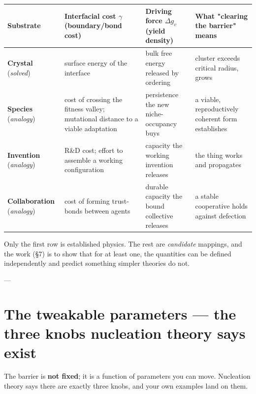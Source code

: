 \documentclass{article}
\begin{document}
\begin{center}
\begin{tabular}{>{\raggedright\arraybackslash}p{3.5cm}>{\raggedright\arraybackslash}p{3.5cm}>{\raggedright\arraybackslash}p{3.5cm}>{\raggedright\arraybackslash}p{3.5cm}}
\toprule
\textbf{Substrate} & \textbf{Interfacial cost $\gamma$ (boundary/bond cost)} & \textbf{Driving force $\Delta g_v$ (yield density)} & \textbf{What "clearing the barrier" means} \\
\midrule
\textbf{Crystal} (\textit{solved}) & surface energy of the interface & bulk free energy released by ordering & cluster exceeds critical radius, grows \\
\textbf{Species} (\textit{analogy}) & cost of crossing the fitness valley; mutational distance to a viable adaptation & persistence the new niche-occupancy buys & a viable, reproductively coherent form establishes \\
\textbf{Invention} (\textit{analogy}) & R\&D cost; effort to assemble a working configuration & capacity the working invention releases & the thing works and propagates \\
\textbf{Collaboration} (\textit{analogy}) & cost of forming trust-bonds between agents & durable capacity the bound collective releases & a stable cooperative holds against defection \\
\bottomrule
\end{tabular}
\end{center}

Only the first row is established physics. The rest are \textit{candidate} mappings, and the work (§7) is to show that for at least one, the quantities can be defined independently and predict something simpler theories do not.

---
\section{The tweakable parameters --- the three knobs nucleation theory says exist}
The barrier is \textbf{not fixed}; it is a function of parameters you can move. Nucleation theory says there are exactly three knobs, and your own examples land on them.
\end{document}

